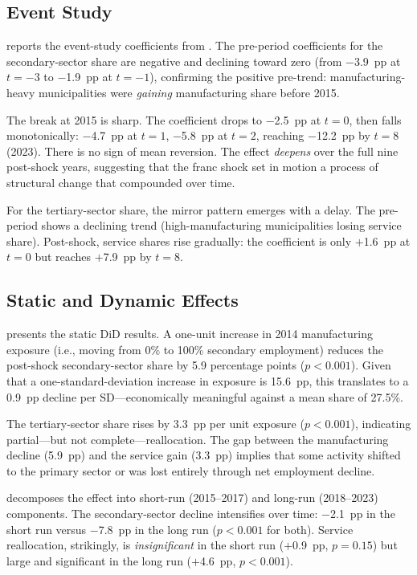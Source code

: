 \documentclass[12pt]{article}
\begin{document}
\subsection{Event Study}

 reports the event-study coefficients from . The pre-period coefficients for the secondary-sector share are negative and declining toward zero (from $-$3.9~pp at $t=-3$ to $-$1.9~pp at $t=-1$), confirming the positive pre-trend: manufacturing-heavy municipalities were \textit{gaining} manufacturing share before 2015.

The break at 2015 is sharp. The coefficient drops to $-$2.5~pp at $t=0$, then falls monotonically: $-$4.7~pp at $t=1$, $-$5.8~pp at $t=2$, reaching $-$12.2~pp by $t=8$ (2023). There is no sign of mean reversion. The effect \textit{deepens} over the full nine post-shock years, suggesting that the franc shock set in motion a process of structural change that compounded over time.

For the tertiary-sector share, the mirror pattern emerges with a delay. The pre-period shows a declining trend (high-manufacturing municipalities losing service share). Post-shock, service shares rise gradually: the coefficient is only $+$1.6~pp at $t=0$ but reaches $+$7.9~pp by $t=8$.



\subsection{Static and Dynamic Effects}

 presents the static DiD results. A one-unit increase in 2014 manufacturing exposure (i.e., moving from 0\% to 100\% secondary employment) reduces the post-shock secondary-sector share by 5.9 percentage points ($p < 0.001$). Given that a one-standard-deviation increase in exposure is 15.6~pp, this translates to a 0.9~pp decline per SD---economically meaningful against a mean share of 27.5\%.



The tertiary-sector share rises by 3.3~pp per unit exposure ($p < 0.001$), indicating partial---but not complete---reallocation. The gap between the manufacturing decline (5.9~pp) and the service gain (3.3~pp) implies that some activity shifted to the primary sector or was lost entirely through net employment decline.

 decomposes the effect into short-run (2015--2017) and long-run (2018--2023) components. The secondary-sector decline intensifies over time: $-$2.1~pp in the short run versus $-$7.8~pp in the long run ($p < 0.001$ for both). Service reallocation, strikingly, is \textit{insignificant} in the short run ($+$0.9~pp, $p = 0.15$) but large and significant in the long run ($+$4.6~pp, $p < 0.001$).
\end{document}
